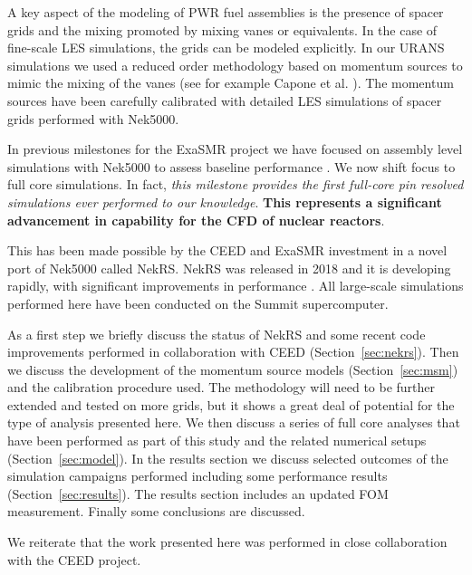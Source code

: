 \documentclass{ecpreportv2}
\begin{document}
A key aspect of the modeling of PWR fuel assemblies is the presence of spacer grids and the mixing promoted by mixing vanes or equivalents. In the case of fine-scale LES simulations, the grids can be modeled explicitly. In our URANS simulations we used a reduced order methodology based on momentum sources to mimic the mixing of the vanes (see for example Capone et al. \cite{Capone2016}). The momentum sources have been carefully calibrated with detailed LES simulations of spacer grids performed with Nek5000.

In previous milestones for the ExaSMR project we have focused on assembly level simulations with Nek5000 to assess baseline performance \cite{merzari2018performance} \cite{merzari2020wall}. We now shift focus to full core simulations. In fact, \textit{this milestone provides the first full-core pin resolved simulations ever performed to our knowledge}. \textbf{This represents a significant advancement in capability for the CFD of nuclear reactors}.

This has been made possible by the CEED and ExaSMR investment in a novel port of Nek5000 called NekRS. NekRS was released in 2018 and it is developing rapidly, with significant improvements in performance \cite{merzari2020toward}. All large-scale simulations performed here have been conducted on the Summit supercomputer.

As a first step we briefly discuss the status of NekRS and some recent code improvements performed in collaboration with CEED (Section~\ref{sec:nekrs}).   Then we discuss the development of the momentum source models (Section~\ref{sec:msm}) and the calibration procedure used. The methodology will need to be further extended and tested on more grids, but it shows a great deal of potential for the type of analysis presented here. We then discuss a series of full core analyses that have been performed as part of this study and the related numerical setups (Section~\ref{sec:model}). In the results section we discuss selected outcomes of the simulation campaigns performed including some performance results (Section~\ref{sec:results}). The results section includes an updated FOM measurement. Finally some conclusions are discussed.

We reiterate  that the work presented here was performed in close collaboration with the CEED project.






\end{document}
